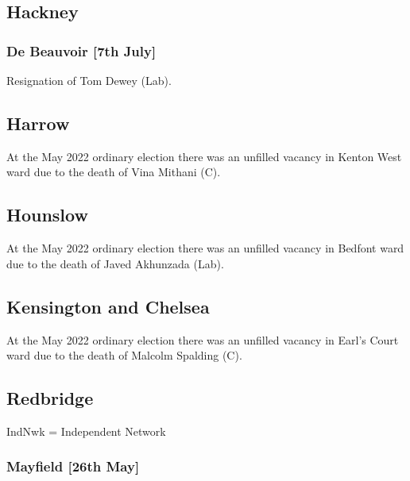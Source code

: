 \documentclass[a4paper,openany]{book}
\begin{document}
\begin{resultsiii}
\subsection*{Hackney}

\subsubsection*{De Beauvoir \hspace*{\fill}\nolinebreak[1]%
	\enspace\hspace*{\fill}
	[7th July]}


Resignation of Tom Dewey (Lab).

\subsection*{Harrow}

At the May 2022 ordinary election there was an unfilled vacancy in Kenton West ward due to the death of Vina Mithani (C).%

\subsection*{Hounslow}

At the May 2022 ordinary election there was an unfilled vacancy in Bedfont ward due to the death of Javed Akhunzada (Lab).%

\subsection*{Kensington and Chelsea}

At the May 2022 ordinary election there was an unfilled vacancy in Earl's Court ward due to the death of Malcolm Spalding (C).%

\subsection*{Redbridge}

IndNwk = Independent Network

\subsubsection*{Mayfield \hspace*{\fill}\nolinebreak[1]%
	\enspace\hspace*{\fill}
	[26th May]}


\end{resultsiii}
\end{document}
